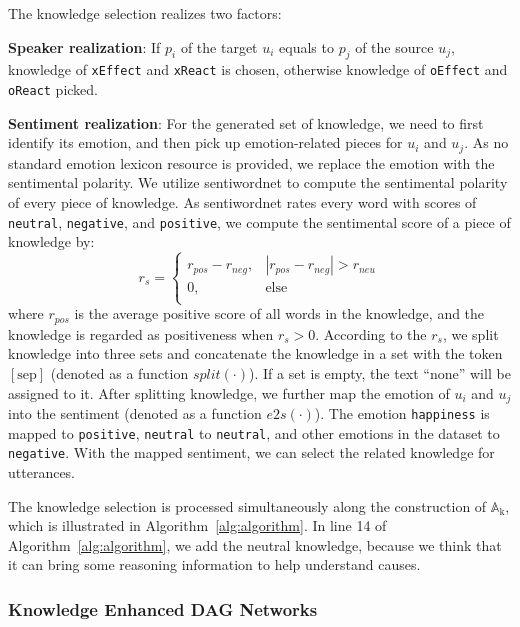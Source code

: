 \documentclass{article}
\begin{document}
The knowledge selection realizes two factors:

\textbf{Speaker realization}: If $p_i$ of the target $u_i$ equals to $p_j$ of the source $u_j$, knowledge of \texttt{xEffect} and \texttt{xReact} is chosen, otherwise knowledge of \texttt{oEffect} and \texttt{oReact} picked. 

\textbf{Sentiment realization}: For the generated set of knowledge, we need to first identify its emotion, and then pick up emotion-related pieces for $u_i$ and $u_j$. As no standard emotion lexicon resource is provided, we replace the emotion with the sentimental polarity. We utilize sentiwordnet to compute the sentimental polarity of every piece of knowledge. As sentiwordnet rates every word with scores of \texttt{neutral}, \texttt{negative}, and \texttt{positive}, we compute the sentimental score of a piece of knowledge by:
\begin{equation}
    r_{s} = \left\{\begin{matrix}
r_{pos}-r_{neg}, & \left| r_{pos}-r_{neg}\right|> r_{neu} \\
0, & \mathrm{else} \\
\end{matrix}\right.
\end{equation}
where $r_{pos}$ is the average positive score of all words in the knowledge, and the knowledge is regarded as positiveness when $r_s>0$. According to the $r_s$, we split knowledge into three sets and concatenate the knowledge in a set with the token $[\mathrm{sep}]$ (denoted as a function $split(\cdot)$). If a set is empty, the text ``none'' will be assigned to it. After splitting knowledge, we further map the emotion of $u_i$ and $u_j$ into the sentiment (denoted as a function $e2s(\cdot)$). The emotion \texttt{happiness} is mapped to \texttt{positive}, \texttt{neutral} to \texttt{neutral}, and other emotions in the dataset to \texttt{negative}. With the mapped sentiment, we can select the related knowledge for utterances. 

The knowledge selection is processed simultaneously along the construction of $\mathrm{\mathbb{A}_{k}}$, which is illustrated in Algorithm~\ref{alg:algorithm}. In line 14 of Algorithm~\ref{alg:algorithm}, we add the neutral knowledge, because we think that it can bring some reasoning information to help understand causes. 

\subsubsection{Knowledge Enhanced DAG Networks}
\end{document}

